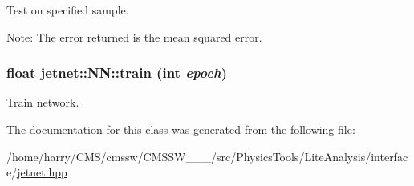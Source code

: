 Test on specified sample. 

Note: The error returned is the mean squared error. \hypertarget{classjetnet_1_1NN_a23}{
\subsubsection[train]{\setlength{\rightskip}{0pt plus 5cm}float jetnet::NN::train (int {\em epoch})}}
\label{classjetnet_1_1NN_a23}


Train network. 



The documentation for this class was generated from the following file:\begin{CompactItemize}
\item 
/home/harry/CMS/cmssw/CMSSW\_\_\_/src/Physics\-Tools/Lite\-Analysis/interface/\hyperlink{jetnet_8hpp}{jetnet.hpp}\end{CompactItemize}
